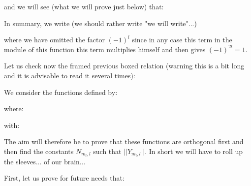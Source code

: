 	and we will see (what we will prove just below) that:
	
	In summary, we write (we should rather write "we will write"...)
	
	where we have omitted the factor $(-1)^l$ since in any case this term in the module of this function this term multiplies himself and then gives $(-1)^{2l}=1$.

Let us check now the framed previous boxed relation (warning this is a bit long and it is advisable to read it several times):

	We consider the functions defined by:
	
	where:
	
	with:
	
	The aim will therefore be to prove that these functions are orthogonal first and then find the constants $N_{m_l,l}$ such that $||Y_{m_l,l}||$. In short we will have to roll up the sleeves... of our brain...

	First, let us prove for future needs that:
	
